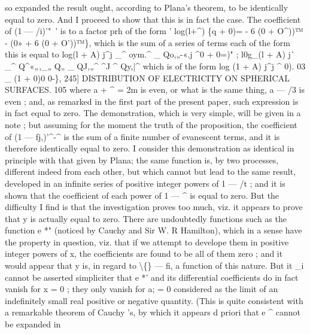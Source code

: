 \documentclass[11pt,a4paper]{book}
\begin{document}
so  expanded  the  result  ought,  according  to  Plana's  theorem,  to  be  identically  equal  to
zero.  And  I  proceed  to  show  that  this  is  in  fact  the  case.  The  coefficient  of
(1  —  /i)'"~'  is  to  a  factor  prh  of  the  form     '
log(l+^)  \{^^1  +  0)=  -  6  (0  +  O^))™  -  (0»  +  6  (0  +  O'))™\},
which  is  the  sum  of  a  series  of  terms  each  of  the  form
this  is  equal   to
log(l  +  A)  j^j  _^  oym.^  _  Qo,„-«.j  ^0  +  0=)" ;
l0g_(l   +  A)    j^^   _^   Q^«„,_„   Q„   _  QJ,„^   ^J   ^  Qy,|^
which   is   of  the   form
log  (1 +  A)  j^j  ^  0).  03  _  (1  +  0)0  0-\},
245]  DISTRIBUTION   OF   ELECTRICITY   ON   SPHERICAL   SURFACES.  105
where  a  +  ^  =  2m  is  even,  or  what  is  the  same  thing,  a  —  /3  is  even ;  and,  as  remarked
in  the  first  part  of  the  present  paper,  such  expression  is  in  fact  equal  to  zero.  The
demonstration,  which  is  very  simple,  will  be  given  in  a  note ;  but  assuming  for  the
moment  the  truth  of  the  proposition,  the  coefficient  of  (1  —  fj,)'^-^  is  the  sum  of  a
finite  number  of  evanescent  terms,  and  it  is  therefore  identically  equal  to  zero.
I  consider  this  demonstration  as  identical  in  principle  with  that  given  by  Plana;
the  same  function  is,  by  two  processes,  different  indeed  from  each  other,  but  which
cannot  but  lead  to  the  same  result,  developed  in  an  infinite  series  of  positive  integer
powers  of  1  —  /t ;  and  it  is  shown  that  the  coefficient  of  each  power  of  1  —  ^  is
equal  to  zero.  But  the  difficulty  I  find  is  that  the  investigation  proves  too  much,  viz.
it  appears  to  prove   that  y   is   actually  equal   to   zero.     There   are    undoubtedly  functions
such  as  the  function  e  *"  (noticed  by  Cauchy  and  Sir  W.  R  Hamilton),  which  in  a
sense  have  the  property  in  question,  viz.  that  if  we  attempt  to  develope  them  in
positive    integer    powers   of  x,   the   coefficients  are   found   to  be   all   of  them   zero ;  and
it   would    appear    that    y  is,    in    regard    to    \textbackslash\{\}  —  fi,    a    function    of   this    nature.     But    it
_i
cannot
be
asserted
simpliciter
that
e  *'  and
its
differential
coefficients
do
in    fact
vanish
for  x  =  0  ;   they
only
vanish
for
a;  =  0   considered
as  the
limit
of  an   indefinitely
small
real
positive
or  negative
quantity.
(This
is   quite
consistent
with
a  remarkable
theorem   of    Cauchy 's,  by   which   it  appears  d   priori   that   e  ^  cannot   be   expanded   in
\end{document}
